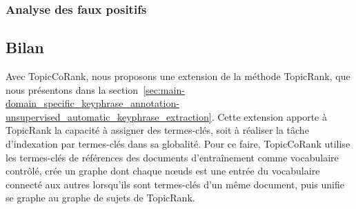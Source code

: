       \subsubsection{Analyse des faux positifs}
      \label{subsec:main-domain_specific_keyphrase_annotation-supervised_automatic_keyphrase_annotation-error_analysis-false_positives}

    \subsection{Bilan}
    \label{subsec:main-domain_specific_keyphrase_annotation-supervised_automatic_keyphrase_annotation-conclusion}
      Avec TopicCoRank, nous proposons une extension de la méthode TopicRank,
      que nous présentons dans la
      section~\ref{sec:main-domain_specific_keyphrase_annotation-unsupervised_automatic_keyphrase_extraction}.
      Cette extension apporte à TopicRank la capacité à assigner des
      termes-clés, soit à réaliser la tâche d'indexation par termes-clés dans sa
      globalité. Pour ce faire, TopicCoRank utilise les termes-clés de
      références des documents d'entraînement comme vocabulaire contrôlé, crée
      un graphe dont chaque n\oe{}uds est une entrée du vocabulaire connecté aux
      autres lorsqu'ils sont termes-clés d'un même document, puis unifie se
      graphe au graphe de sujets de TopicRank.



